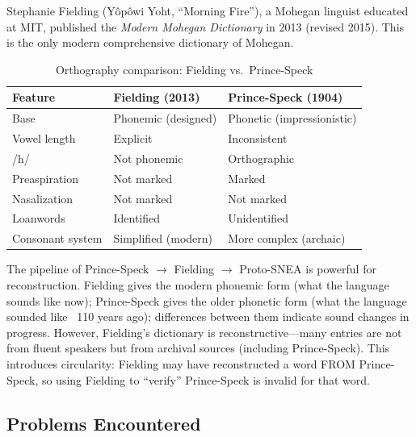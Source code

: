 Stephanie Fielding (Yôpôwi Yoht, ``Morning Fire''), a Mohegan linguist
educated at MIT, published the \emph{Modern Mohegan Dictionary} in 2013
(revised 2015). This is the only modern comprehensive dictionary of Mohegan.

\begin{table}[h]
\centering
\begin{tabular}{lll}
\toprule
\textbf{Feature} & \textbf{Fielding (2013)} & \textbf{Prince-Speck (1904)} \\
\midrule
Base & Phonemic (designed) & Phonetic (impressionistic) \\
Vowel length & Explicit & Inconsistent \\
/h/ & Not phonemic & Orthographic \\
Preaspiration & Not marked & Marked \\
Nasalization & Not marked & Not marked \\
Loanwords & Identified & Unidentified \\
Consonant system & Simplified (modern) & More complex (archaic) \\
\bottomrule
\end{tabular}
\caption{Orthography comparison: Fielding vs.\ Prince-Speck}
\label{tab:1368-fielding-comparison}
\end{table}

The pipeline of Prince-Speck $\rightarrow$ Fielding $\rightarrow$ Proto-SNEA
is powerful for reconstruction. Fielding gives the modern phonemic form (what
the language sounds like now); Prince-Speck gives the older phonetic form
(what the language sounded like ~110 years ago); differences between them
indicate sound changes in progress. However, Fielding's dictionary is
reconstructive---many entries are not from fluent speakers but from archival
sources (including Prince-Speck). This introduces circularity: Fielding may
have reconstructed a word FROM Prince-Speck, so using Fielding to ``verify''
Prince-Speck is invalid for that word.

\subsection{Problems Encountered}


